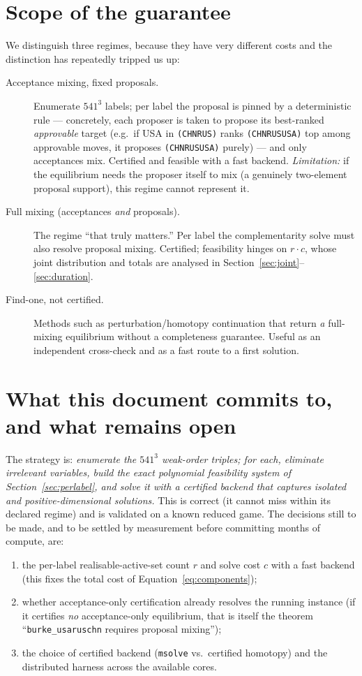 \documentclass[11pt]{article}
\newcommand{\state}[1]{\texttt{(#1)}}
\begin{document}
\section{Scope of the guarantee}
\label{sec:scope}
We distinguish three regimes, because they have very different costs and the
distinction has repeatedly tripped us up:
\begin{description}
\item[Acceptance mixing, fixed proposals.] Enumerate $541^3$ labels; per label the
proposal is pinned by a deterministic rule --- concretely, each proposer is taken to
propose its best-ranked \emph{approvable} target (e.g.\ if USA in \state{CHNRUS}
ranks \state{CHNRUSUSA} top among approvable moves, it proposes \state{CHNRUSUSA}
purely) --- and only acceptances mix. Certified and feasible with a fast backend.
\emph{Limitation:} if the equilibrium needs the proposer itself to mix (a genuinely
two-element proposal support), this regime cannot represent it.
\item[Full mixing (acceptances \emph{and} proposals).] The regime ``that truly
matters.'' Per label the complementarity solve must also resolve proposal mixing.
Certified; feasibility hinges on $r\cdot c$, whose joint distribution and totals are analysed in Section~\ref{sec:joint}--\ref{sec:duration}.
\item[Find-one, not certified.] Methods such as perturbation/homotopy continuation
that return \emph{a} full-mixing equilibrium without a completeness guarantee. Useful
as an independent cross-check and as a fast route to a first solution.
\end{description}

\section{What this document commits to, and what remains open}
\label{sec:open}
The strategy is: \emph{enumerate the $541^3$ weak-order triples; for each, eliminate
irrelevant variables, build the exact polynomial feasibility system of
Section~\ref{sec:perlabel}, and solve it with a certified backend that captures
isolated and positive-dimensional solutions.} This is correct (it cannot miss within
its declared regime) and is validated on a known reduced game. The decisions still to
be made, and to be settled by measurement before committing months of compute, are:
\begin{enumerate}[nosep]
\item the per-label realisable-active-set count $r$ and solve cost $c$ with a fast
backend (this fixes the total cost of Equation~\eqref{eq:components});
\item whether acceptance-only certification already resolves the running instance (if
it certifies \emph{no} acceptance-only equilibrium, that is itself the theorem
``\texttt{burke\_usaruschn} requires proposal mixing'');
\item the choice of certified backend (\texttt{msolve} vs.\ certified homotopy) and
the distributed harness across the available cores.
\end{enumerate}
\end{document}
